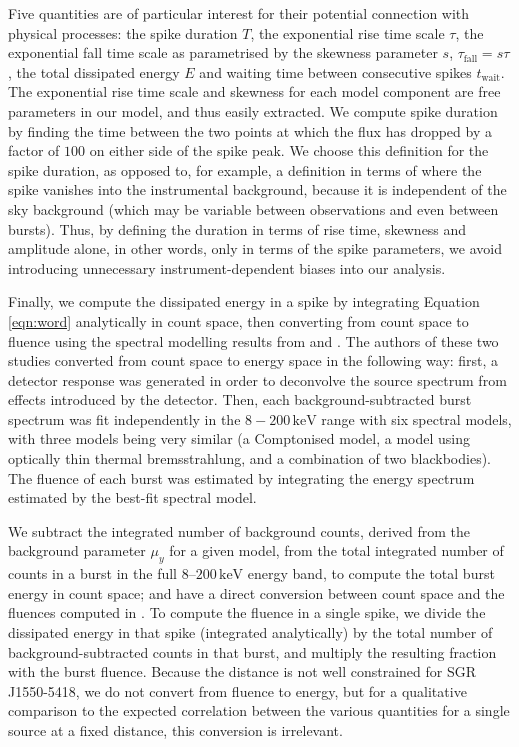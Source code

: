 \documentclass[12pt]{emulateapj}
\newcommand{\counts}{y}
\begin{document}
Five quantities are of particular interest for their potential connection with physical processes: the spike duration $T$, the exponential rise time scale $\tau$, the exponential fall
time scale as parametrised by the skewness parameter $s$, $\tau_{\mathrm{fall}} = s\tau$, the total dissipated energy $E$ and waiting 
time between consecutive spikes $t_\mathrm{wait}$. The exponential rise time scale and skewness for each model component are free parameters
in our model, and thus easily extracted. We compute spike duration by finding the time between the two points at which the flux has dropped by a
 factor of $100$ on either side of the spike peak. We choose this definition for the spike duration, as opposed to, for example, a definition in terms of where the spike vanishes
 into the instrumental background, because it is independent of the sky background (which may be variable between observations and even between bursts). Thus, by defining the 
 duration in terms of rise time, skewness and amplitude alone, in other words, only in terms of the spike parameters, we avoid introducing unnecessary instrument-dependent
 biases into our analysis.


 Finally, we compute the dissipated energy in a spike by integrating Equation \ref{eqn:word} analytically in count space,
 then converting from count space to fluence using the spectral modelling results from \citet{vanderhorst2012} and \citet{vonkienlin2012}. The authors of these two studies converted from 
 count space to energy space in the following way: first, a detector response was generated in order to deconvolve the source spectrum from effects introduced by the detector. 
 Then, each background-subtracted burst spectrum was fit independently in the $8-200\,\mathrm{keV}$ range with six spectral models, with three models being very similar
  (a Comptonised model, a model using optically thin thermal bremsstrahlung, and a combination of two blackbodies). The fluence of each burst was estimated by integrating the 
  energy spectrum estimated by the best-fit spectral model.
 
 We subtract the integrated number of 
 background counts, derived from the background parameter $\mu_\counts$ for a given model, from the total integrated number of 
 counts in a burst in the full $8$--$200\,\mathrm{keV}$ energy band, to compute the total burst energy in count space; and have a direct conversion between count space and 
 the fluences computed in \citet{vanderhorst2012}. To compute the fluence in a single spike, we divide the dissipated energy in that spike (integrated analytically)
 by the total number of background-subtracted counts in that burst, and multiply the resulting fraction with the burst fluence. 
 Because the distance is not well constrained for SGR J1550-5418, we do not convert from fluence to energy, but for a qualitative comparison to the expected correlation between the 
 various quantities for a single source at a fixed distance, this conversion is irrelevant.
  
\end{document}
